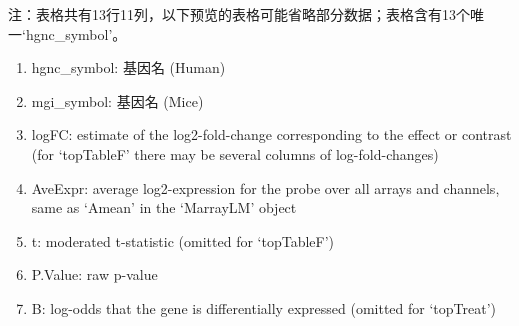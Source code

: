 \documentclass[
]{article}
\providecommand{\tightlist}{%
  \setlength{\itemsep}{0pt}\setlength{\parskip}{0pt}}
\begin{document}
\begin{center}\begin{tcolorbox}[colback=gray!10, colframe=gray!50, width=0.9\linewidth, arc=1mm, boxrule=0.5pt]注：表格共有13行11列，以下预览的表格可能省略部分数据；表格含有13个唯一`hgnc\_symbol'。
\end{tcolorbox}
\end{center}
\begin{center}\begin{tcolorbox}[colback=gray!10, colframe=gray!50, width=0.9\linewidth, arc=1mm, boxrule=0.5pt]\begin{enumerate}\tightlist
\item hgnc\_symbol:  基因名 (Human)
\item mgi\_symbol:  基因名 (Mice)
\item logFC:  estimate of the log2-fold-change corresponding to the effect or contrast (for ‘topTableF’ there may be several columns of log-fold-changes)
\item AveExpr:  average log2-expression for the probe over all arrays and channels, same as ‘Amean’ in the ‘MarrayLM’ object
\item t:  moderated t-statistic (omitted for ‘topTableF’)
\item P.Value:  raw p-value
\item B:  log-odds that the gene is differentially expressed (omitted for ‘topTreat’)
\end{enumerate}\end{tcolorbox}
\end{center}
\end{document}
